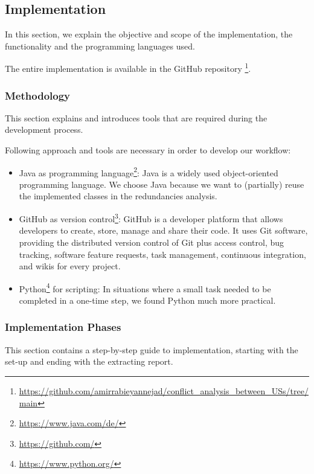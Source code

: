 \subsection{Implementation}\label{conflict_implementation}
In this section, we explain the objective and scope of the implementation, the functionality and the programming languages used.

The entire implementation is available in the GitHub repository \footnote{\href{https://github.com/amirrabieyannejad/conflict\_analysis\_between\_USs/tree/main}{https://github.com/amirrabieyannejad/conflict\_analysis\_between\_USs/tree/main}}.
\subsubsection*{Methodology}
This section explains and introduces tools that are required during the development process.

Following approach and tools are necessary in order to develop our workflow:
\begin{itemize}	
	\item Java as programming language\footnote{\href{https://www.java.com/de/}{https://www.java.com/de/}}: Java is a widely used object-oriented programming language. We choose Java because we want to (partially) reuse the implemented classes in the redundancies analysis.
	
	\item GitHub as version control\footnote{\href{https://github.com/}{https://github.com/}}: GitHub is a developer platform that allows developers to create, store, manage and share their code. It uses Git software, providing the distributed version control of Git plus access control, bug tracking, software feature requests, task management, continuous integration, and wikis for every project.
	
	\item Python\footnote{\href{https://www.python.org/}{https://www.python.org/}} for scripting: In situations where a small task needed to be completed in a one-time step, we found Python much more practical.
	
\end{itemize} 
\subsubsection*{Implementation Phases}\label{conflict_phases}
This section contains a step-by-step guide to implementation, starting with the set-up and ending with the extracting report.


